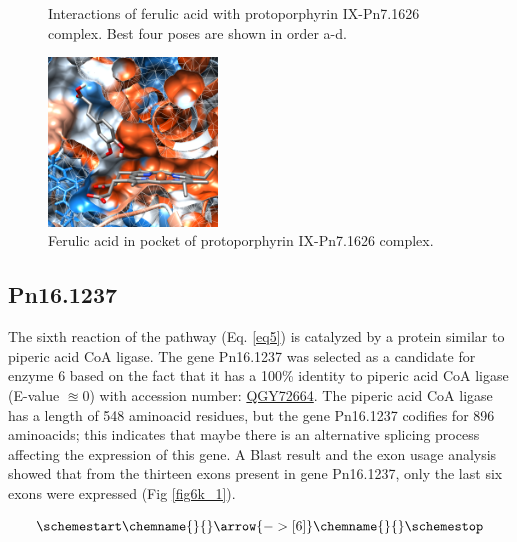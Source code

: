 \documentclass[12pt]{article}
\begin{document}
\begin{figure}[h!]
\begin{subfigure}[h!]{0.35\textwidth}
			\caption{}
		\end{subfigure}
		\hfill
		\caption[Interactions between ferulic acid and protoporphyrin IX-Pn7.1626 complex.]{\centering Interactions of ferulic acid with protoporphyrin IX-Pn7.1626 complex. Best four poses are shown in order a-d.}
		\label{fig5p_5}
	\end{figure}
	\FloatBarrier
	
	\FloatBarrier
	\begin{figure}[h!]
		\centering
		\includegraphics[width=0.4\textwidth]{../5/propose/Dock/Dock2/chimera.png}
		\caption{\centering Ferulic acid in pocket of protoporphyrin IX-Pn7.1626 complex.}
		\label{fig5p_6}
	\end{figure}
	\FloatBarrier
	
	\subsection{Pn16.1237}
	
	The sixth reaction of the pathway (Eq. \ref{eq5}) is catalyzed by a protein similar to piperic acid CoA ligase. The gene Pn16.1237 was selected as a candidate for enzyme 6 based on the fact that it has a 100\% identity to piperic acid CoA ligase (E-value $\approxeq 0$) with accession number: \href{https://www.ncbi.nlm.nih.gov/protein/QGY72664.1/}{QGY72664}. The piperic acid CoA ligase has a length of 548 aminoacid residues, but the gene Pn16.1237 codifies for 896 aminoacids; this indicates that maybe there is an alternative splicing process affecting the expression of this gene. A Blast result and the exon usage analysis showed that from the thirteen exons present in gene Pn16.1237, only the last six exons were expressed (Fig \ref{fig6k_1}).
	
	\begin{equation}
	\schemestart
	\chemname{\footnotesize}{\vspace{-100pt}}\arrow{->[ 6]}\chemname{\footnotesize}{\vspace{-100pt}}
	\label{eq5}
	\schemestop
	\end{equation}\\
	
\end{document}
